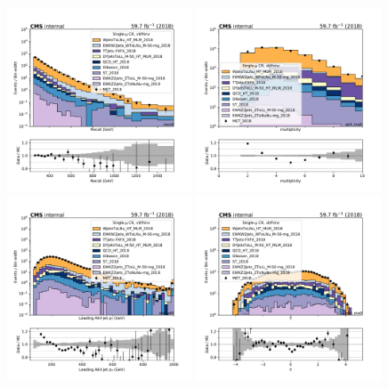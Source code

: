 {\begin{figure}[htbp]
    \begin{center}
        \includegraphics[width=0.49\textwidth]{fig/datamc/cr_1m_vbf/cr_1m_vbf_recoil_losf_2018.pdf}
        \includegraphics[width=0.49\textwidth]{fig/datamc/cr_1m_vbf/cr_1m_vbf_ak4_mult_losf_2018.pdf} \\
        \includegraphics[width=0.49\textwidth]{fig/datamc/cr_1m_vbf/cr_1m_vbf_ak4_pt0_losf_2018.pdf}
        \includegraphics[width=0.49\textwidth]{fig/datamc/cr_1m_vbf/cr_1m_vbf_ak4_eta0_losf_2018.pdf}

\end{center}
\end{figure}}
